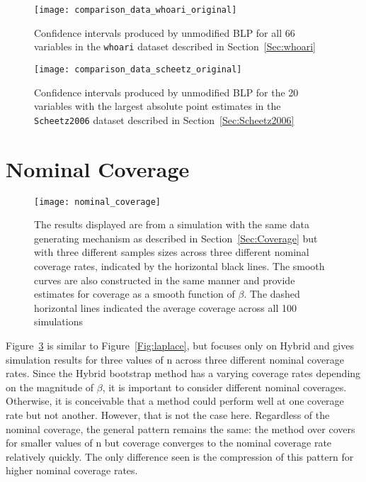 \begin{appendices}
\begin{figure}[hbtp]
  \begin{center}
  \texttt{[image: comparison\_data\_whoari\_original]}
  \caption{\label{Fig:comparison_data_whoari_original} Confidence intervals produced by unmodified BLP for all 66 variables in the \texttt{whoari} dataset described in Section~\ref{Sec:whoari}}
  \end{center}
\end{figure}

\begin{figure}[hbtp]
  \begin{center}
  \texttt{[image: comparison\_data\_scheetz\_original]}
  \caption{\label{Fig:comparison_data_scheetz_original} Confidence intervals produced by unmodified BLP for the 20 variables with the largest absolute point estimates in the \texttt{Scheetz2006} dataset described in Section~\ref{Sec:Scheetz2006}}
  \end{center}
\end{figure}

\newpage

\section{Nominal Coverage}\label{Sup:D}

\begin{figure}[hbtp]
  \begin{center}
  \texttt{[image: nominal\_coverage]}
  \caption{\label{Fig:nominal_coverage}  The results displayed are from a simulation with the same data generating mechanism as described in Section~\ref{Sec:Coverage} but with three different samples sizes across three different nominal coverage rates, indicated by the horizontal black lines. The smooth curves are also constructed in the same manner and provide estimates for coverage as a smooth function of $\beta$. The dashed horizontal lines indicated the average coverage across all 100 simulations}
  \end{center}
\end{figure} 

Figure~\ref{Fig:nominal_coverage} is similar to Figure~\ref{Fig:laplace}, but focuses only on Hybrid and gives simulation results for three values of n across three different nominal coverage rates. Since the Hybrid bootstrap method has a varying coverage rates depending on the magnitude of $\beta$, it is important to consider different nominal coverages. Otherwise, it is conceivable that a method could perform well at one coverage rate but not another. However, that is not the case here. Regardless of the nominal coverage, the general pattern remains the same: the method over covers for smaller values of n but coverage converges to the nominal coverage rate relatively quickly. The only difference seen is the compression of this pattern for higher nominal coverage rates.

\end{appendices}
